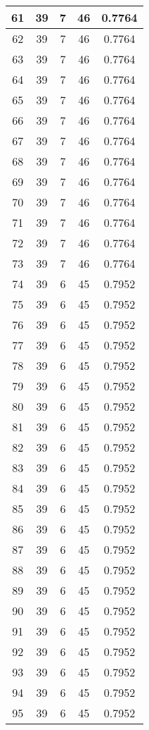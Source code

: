 \documentclass[letterpaper, 12pt]{article}
\begin{document}
\begin{longtable}{|c|c|c|c|c|}
\hline
61 & 39 & 7 & 46 & 0.7764 \\
\hline
62 & 39 & 7 & 46 & 0.7764 \\
\hline
63 & 39 & 7 & 46 & 0.7764 \\
\hline
64 & 39 & 7 & 46 & 0.7764 \\
\hline
65 & 39 & 7 & 46 & 0.7764 \\
\hline
66 & 39 & 7 & 46 & 0.7764 \\
\hline
67 & 39 & 7 & 46 & 0.7764 \\
\hline
68 & 39 & 7 & 46 & 0.7764 \\
\hline
69 & 39 & 7 & 46 & 0.7764 \\
\hline
70 & 39 & 7 & 46 & 0.7764 \\
\hline
71 & 39 & 7 & 46 & 0.7764 \\
\hline
72 & 39 & 7 & 46 & 0.7764 \\
\hline
73 & 39 & 7 & 46 & 0.7764 \\
\hline
74 & 39 & 6 & 45 & 0.7952 \\
\hline
75 & 39 & 6 & 45 & 0.7952 \\
\hline
76 & 39 & 6 & 45 & 0.7952 \\
\hline
77 & 39 & 6 & 45 & 0.7952 \\
\hline
78 & 39 & 6 & 45 & 0.7952 \\
\hline
79 & 39 & 6 & 45 & 0.7952 \\
\hline
80 & 39 & 6 & 45 & 0.7952 \\
\hline
81 & 39 & 6 & 45 & 0.7952 \\
\hline
82 & 39 & 6 & 45 & 0.7952 \\
\hline
83 & 39 & 6 & 45 & 0.7952 \\
\hline
84 & 39 & 6 & 45 & 0.7952 \\
\hline
85 & 39 & 6 & 45 & 0.7952 \\
\hline
86 & 39 & 6 & 45 & 0.7952 \\
\hline
87 & 39 & 6 & 45 & 0.7952 \\
\hline
88 & 39 & 6 & 45 & 0.7952 \\
\hline
89 & 39 & 6 & 45 & 0.7952 \\
\hline
90 & 39 & 6 & 45 & 0.7952 \\
\hline
91 & 39 & 6 & 45 & 0.7952 \\
\hline
92 & 39 & 6 & 45 & 0.7952 \\
\hline
93 & 39 & 6 & 45 & 0.7952 \\
\hline
94 & 39 & 6 & 45 & 0.7952 \\
\hline
95 & 39 & 6 & 45 & 0.7952 \\

\end{longtable}
\end{document}
